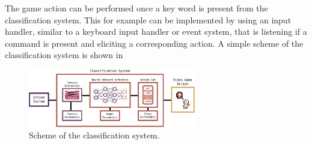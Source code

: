 The game action can be performed once a key word is present from the classification system.
This for example can be implemented by using an input handler, similar to a keyboard input handler or event system, that is listening if a command is present and eliciting a corresponding action.
A simple scheme of the classification system is shown in 
\begin{figure}[!ht]
  \centering
  \includegraphics[width=0.65\textwidth]{./6_game/figs/game_system_classification}
  \caption{Scheme of the classification system.}
  \label{fig:game_system_classification}
\end{figure}
\FloatBarrier
\noindent

